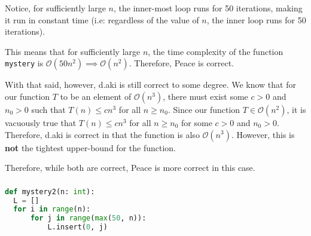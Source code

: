 \documentclass[12pt]{article}
\begin{document}
\begin{center}
\end{center}
Notice, for sufficiently large $n$, the inner-most loop runs for 50 iterations, making it run in constant time (i.e: regardless of the value of $n$, the inner loop runs for 50 iterations). 

This means that for sufficiently large $n$, the time complexity of the function \texttt{mystery} is $\mathcal{O}(50n^2) \implies \mathcal{O}(n^2)$. Therefore, Peace is correct.

With that said, however, d.aki is still correct to some degree. We know that for our function $T$ to be an element of $\mathcal{O}(n^3)$, there must exist some $c > 0$ and $n_0 > 0$ such that $T(n) \leq cn^3$ for all $n \geq n_0$. Since our function $T \in \mathcal{O}(n^2)$, it is vacuously true that $T(n) \leq cn^3$ for all $n \geq n_0$ for some $c > 0$ and $n_0 > 0$. Therefore, d.aki is correct in that the function is also $\mathcal{O}(n^3)$. However, this is \textbf{not} the tightest upper-bound for the function.

Therefore, while both are correct, Peace is more correct in this case.

\subsubsection{}
\begin{lstlisting}[language=Python,style=mystyle]
def mystery2(n: int):
  L = []
  for i in range(n):
      for j in range(max(50, n)):
          L.insert(0, j)
\end{lstlisting}
\end{document}
